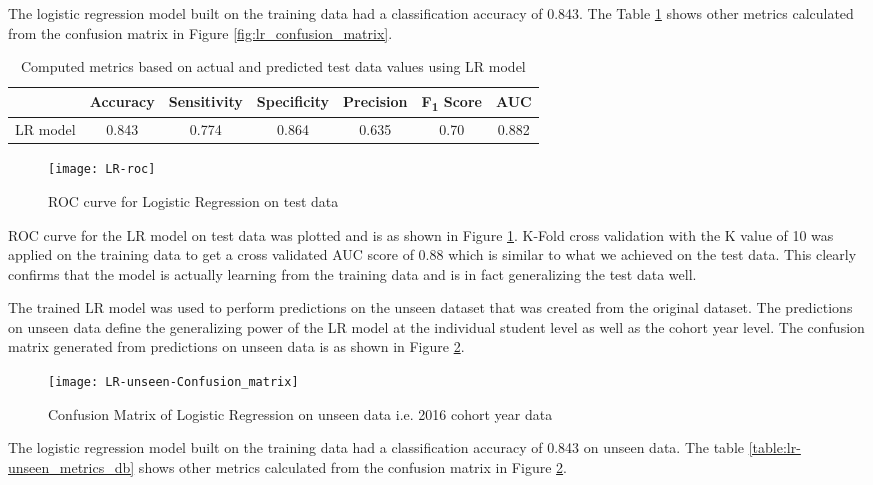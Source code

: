\documentclass[11pt,openright]{report}
\begin{document}
The logistic regression model built on the training data had a classification accuracy of 0.843. The Table \ref{table:lr-metrics_db} shows other metrics calculated from the confusion matrix in Figure \ref{fig:lr_confusion_matrix}. 
\begin{table} [!htb]
	\renewcommand{\arraystretch}{1.3}
	\caption{Computed metrics based on actual and predicted test data values using LR model}
	\label{table:lr-metrics_db}
	\centering
	\begin{tabular}{|c|c|c|c|c|c|c|}
    \hline
  	 & \bfseries Accuracy & \bfseries Sensitivity & \bfseries Specificity & \bfseries Precision & \bfseries F\textsubscript{1} Score  & \bfseries AUC\\  
    \hline
	LR model & 0.843 & 0.774 & 0.864 & 0.635 & 0.70 & 0.882 \\ \hline
	\end{tabular} 
\end{table}


 \begin{figure}[!htb]
	\centering
	\texttt{[image: LR-roc]}
	\caption{ROC curve for Logistic Regression on test data}
	\label{fig:lr_roc}
\end{figure} 

ROC curve for the LR model on test data was plotted and is as shown in Figure \ref{fig:lr_roc}. K-Fold cross validation with the K value of 10 was applied on the training data to get a cross validated AUC score of 0.88 which is similar to what we achieved on the test data. This clearly confirms that the model is actually learning from the training data and is in fact generalizing the test data well.

The trained LR model was used to perform predictions on the unseen dataset that was created from the original dataset. The predictions on unseen data define the generalizing power of the LR model at the individual student level as well as the cohort year level. The confusion matrix generated from predictions on unseen data is as shown in Figure \ref{fig:lr_unseen_confusion_matrix}.

  \begin{figure}[!htb]
	\centering
	\texttt{[image: LR-unseen-Confusion\_matrix]}
	\caption{Confusion Matrix of Logistic Regression on unseen data i.e. 2016 cohort year data}
	\label{fig:lr_unseen_confusion_matrix}
\end{figure} 


The logistic regression model built on the training data had a classification accuracy of 0.843 on unseen data. The table \ref{table:lr-unseen_metrics_db} shows other metrics calculated from the confusion matrix in Figure \ref{fig:lr_unseen_confusion_matrix}.
\end{document}
